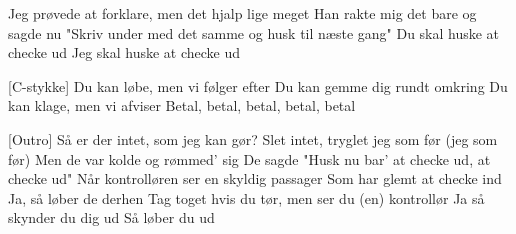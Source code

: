 \documentclass[a4paper,11pt]{article}
\begin{document}
\begin{song}
 Jeg prøvede at forklare, men det hjalp lige meget
    Han rakte mig det bare og sagde nu
    "Skriv under med det samme og husk til næste gang"
 Du skal huske at checke ud
 Jeg skal huske at checke ud


[C-stykke] Du kan løbe, men vi følger efter
    Du kan gemme dig rundt omkring
    Du kan klage, men vi afviser
    Betal, betal, betal, betal, betal

[Outro] Så er der intet, som jeg kan gør?
    Slet intet, tryglet jeg som før (jeg som før)
    Men de var kolde og rømmed' sig
    De sagde "Husk nu bar' at checke ud, at checke ud"
    Når kontrolløren ser en skyldig passager
    Som har glemt at checke ind
    Ja, så løber de derhen
    Tag toget hvis du tør, men ser du (en) kontrollør
    Ja så skynder du dig ud
    Så løber du ud

    
\end{song}
\end{document}

